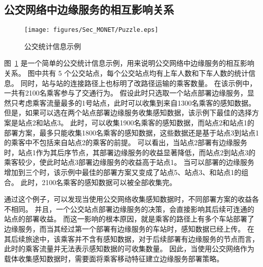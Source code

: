 


\subsection{公交网络中边缘服务的相互影响关系}

\begin{figure}[!b]
  \centering
  \texttt{[image: figures/Sec\_MONET/Puzzle.eps]}
  \caption{公交统计信息示例}
  \label{Figure_puzzle}
\end{figure}

图~\ref{Figure_puzzle} 是一个简单的公交统计信息示例，用来说明公交网络中边缘服务的相互影响关系。
图中共有 5 个公交站点，每个公交站点均有上车人数和下车人数的统计信息。
同时，站与站的连接路径上也标明了改路径运输的乘客数量。
在该示例中，一共有2100名乘客参与了交通行为。
假设此时只选取一个站点部署边缘服务，显然只考虑乘客流量最多的1号站点，此时可以收集到来自1300名乘客的感知数据。
但是，如果可以选在两个站点部署边缘服务收集感知数据，该示例下最佳的选择方案是站点2和站点3。
此时，可以收集1900名乘客的感知数据，而站点2和站点1的部署方案，最多只能收集1800名乘客的感知数据，这些数据还是基于站点3到站点1的乘客中不包括来自站点2的乘客的前提。
可以看出，当站点2部署有边缘服务时，站点1作为其后序节点，其部署边缘服务的收益显著降低，而站点2到站点3的乘客较少，使此时站点3部署边缘服务的收益高于站点1。
当可以部署的边缘服务增加到三个时，该示例中最佳的部署方案又变成了站点5、站点3、和站点1的组合。
此时，2100名乘客的感知数据可以被全部收集完。

通过这个例子，可以发现当使用公交网络收集感知数据时，不同部署方案的收益各不相同。
并且，一个公交站点部署边缘服务的决策，会直接影响其后续可连通的站点的部署收益。
而这一影响的根本原因，就是乘客的路径上有多个车站部署了边缘服务，而当其经过第一个部署有边缘服务的车站时，感知数据已经上传。
在其后续旅途中，该乘客并不含有感知数据，对于后续部署有边缘服务的节点而言，此时的乘客流量并无法表示感知数据的可收集数量。
因此，当使用公交网络作为载体收集感知数据时，需要面将乘客移动特征建立边缘服务部署策略。

